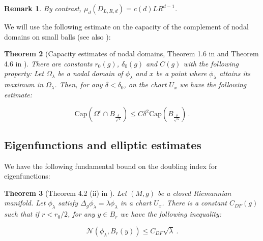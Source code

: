 \documentclass{amsart}
\newtheorem{theorem}{Theorem}[section]
\newtheorem{remark}[theorem]{Remark}
\begin{document}
\begin{itemize}
\begin{remark}
    By contrast, $\mu_d(D_{L,R,d}) = c(d) LR^{d-1}$.
\end{remark}



We will use the following estimate on the capacity of the complement of nodal domains on small balls (see also \cites{ lieb, mazya-shubin}):
\begin{theorem}[Capacity estimates of nodal domains, Theorem 1.6 in \cite{geor-mukh} and Theorem 4.6 in \cite{cha-man}]\label{lemma:capacitycomplement}
There are constants $r_0(g)$, $\delta_0(g)$ and $C(g)$ with the following property:
Let $\Omega_\lambda$ be a nodal domain of $\phi_\lambda$ and $x$ be a point where $\phi_\lambda$ attains its maximum in $\Omega_\lambda$. Then, for any $\delta < \delta_0$, on the chart $U_x$ we have the following estimate:

\begin{equation}
    \text{Cap}\left(\Omega^c \cap B_{\frac{\delta}{\sqrt{\lambda}}} \right)\leq C \delta^2 \text{Cap}\left(B_{\frac{\delta}{\sqrt{\lambda}}}\right) \, .
\end{equation}
    
\end{theorem}



\end{itemize}

\subsection{Eigenfunctions and elliptic estimates}\label{subsection:tools}








We have the following fundamental bound on the doubling index for eigenfunctions:
\begin{theorem}[Theorem 4.2 (ii) in \cite{don-fef88}]\label{thm:df-growth}
    Let $(M, g)$ be a closed Riemannian manifold. Let $\phi_\lambda$ satisfy \linebreak $\Delta_g \phi_\lambda = \lambda \phi_\lambda$ in a chart $U_x$. There is a constant $C_{DF}(g)$ such that if $r < r_0/2$, for any $y \in B_r$ we have the following inequality:

    $$\mathcal{N}\left(\phi_\lambda, B_r(y)\right) \leq C_{DF}\sqrt{\lambda}\ .$$
   
\end{theorem}
\end{document}
